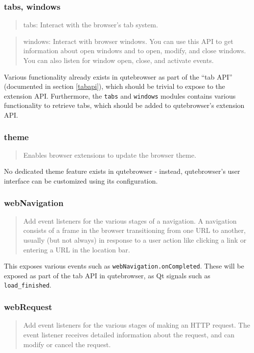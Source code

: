 \subsubsection{tabs, windows}
\begin{quote}
tabs: Interact with the browser's tab system.
\end{quote}
\begin{quote}
windows: Interact with browser windows. You can use this API to get information about open windows and to open, modify, and close windows. You can also listen for window open, close, and activate events.
\end{quote}

Various functionality already exists in qutebrowser as part of the ``tab API''
(documented in section \ref{tabapi}), which should be trivial to expose to the
extension API. Furthermore, the \verb|tabs| and \verb|windows| modules contains
various functionality to retrieve tabs, which should be added to qutebrowser's
extension API.

\subsubsection{theme}
\begin{quote}
Enables browser extensions to update the browser theme.
\end{quote}

No dedicated theme feature exists in qutebrowser - instead, qutebrowser's user
interface can be customized using its configuration.

\subsubsection{webNavigation}
\begin{quote}
Add event listeners for the various stages of a navigation. A navigation consists of a frame in the browser transitioning from one URL to another, usually (but not always) in response to a user action like clicking a link or entering a URL in the location bar.
\end{quote}

This exposes various events such as \verb|webNavigation.onCompleted|. These will
be exposed as part of the tab API in qutebrowser, as Qt signals such as \verb|load_finished|.

\subsubsection{webRequest}
\begin{quote}
Add event listeners for the various stages of making an HTTP request. The event listener receives detailed information about the request, and can modify or cancel the request.
\end{quote}


